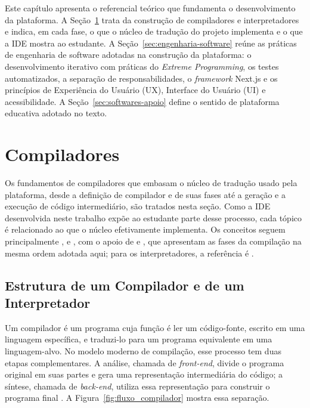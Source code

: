 
Este capítulo apresenta o referencial teórico que fundamenta o desenvolvimento da plataforma. A Seção~\ref{sec:compiladores} trata da construção de compiladores e interpretadores e indica, em cada fase, o que o núcleo de tradução do projeto implementa e o que a IDE mostra ao estudante. A Seção~\ref{sec:engenharia-software} reúne as práticas de engenharia de software adotadas na construção da plataforma: o desenvolvimento iterativo com práticas do \textit{Extreme Programming}, os testes automatizados, a separação de responsabilidades, o \textit{framework} Next.js e os princípios de Experiência do Usuário (UX), Interface do Usuário (UI) e acessibilidade. A Seção~\ref{sec:softwares-apoio} define o sentido de plataforma educativa adotado no texto.

\section{Compiladores}
\label{sec:compiladores}

Os fundamentos de compiladores que embasam o núcleo de tradução usado pela plataforma, desde a definição de compilador e de suas fases até a geração e a execução de código intermediário, são tratados nesta seção. Como a IDE desenvolvida neste trabalho expõe ao estudante parte desse processo, cada tópico é relacionado ao que o núcleo efetivamente implementa. Os conceitos seguem principalmente ,  e , com o apoio de  e , que apresentam as fases da compilação na mesma ordem adotada aqui; para os interpretadores, a referência é .

\subsection{Estrutura de um Compilador e de um Interpretador}

Um compilador é um programa cuja função é ler um código-fonte, escrito em uma linguagem específica, e traduzi-lo para um programa equivalente em uma linguagem-alvo. No modelo moderno de compilação, esse processo tem duas etapas complementares. A análise, chamada de \textit{front-end}, divide o programa original em suas partes e gera uma representação intermediária do código; a síntese, chamada de \textit{back-end}, utiliza essa representação para construir o programa final \cite{aho1995,cooper2012,grune2012}. A Figura~\ref{fig:fluxo_compilador} mostra essa separação.

